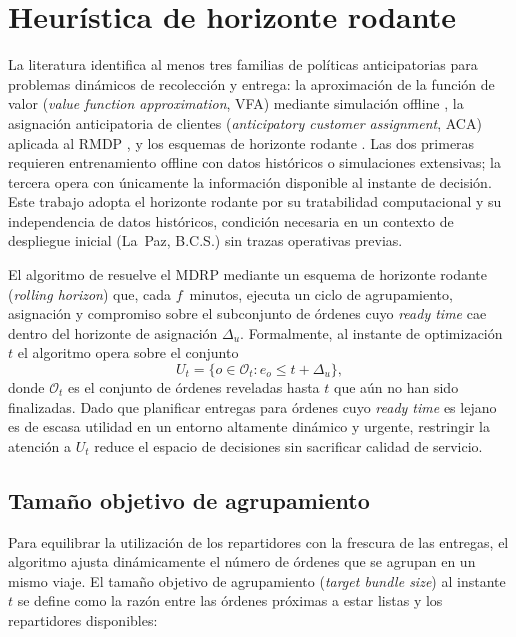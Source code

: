 \documentclass[12pt,letterpaper,oneside]{book}
\begin{document}
	\section{Heurística de horizonte rodante}

	La literatura identifica al menos tres familias de políticas
	anticipatorias para problemas dinámicos de recolección y entrega: la
	aproximación de la función de valor (\textit{value function
	approximation}, VFA) mediante simulación offline
	\citep{Ulmer2018VFA}, la asignación anticipatoria de clientes
	(\textit{anticipatory customer assignment}, ACA) aplicada al RMDP
	\citep{Ulmer2021RMDP}, y los esquemas de horizonte rodante
	\citep{Reyes2018}.  Las dos primeras requieren entrenamiento offline
	con datos históricos o simulaciones extensivas; la tercera opera con
	únicamente la información disponible al instante de decisión.  Este
	trabajo adopta el horizonte rodante por su tratabilidad computacional
	y su independencia de datos históricos, condición necesaria en un
	contexto de despliegue inicial (La~Paz, B.C.S.) sin trazas operativas
	previas.

	El algoritmo de \citet{Reyes2018} resuelve el MDRP mediante un esquema de
	horizonte rodante (\textit{rolling horizon}) que, cada $f$~minutos,
	ejecuta un ciclo de agrupamiento, asignación y compromiso sobre el
	subconjunto de órdenes cuyo \textit{ready time} cae dentro del horizonte de
	asignación $\Delta_u$.  Formalmente, al instante de optimización $t$ el
	algoritmo opera sobre el conjunto
	\[
		U_t = \{o \in \mathcal{O}_t : e_o \leq t + \Delta_u\},
	\]
	donde $\mathcal{O}_t$ es el conjunto de órdenes reveladas hasta $t$ que aún
	no han sido finalizadas.  Dado que planificar entregas para órdenes cuyo
	\textit{ready time} es lejano es de escasa utilidad en un entorno altamente
	dinámico y urgente, restringir la atención a $U_t$ reduce el espacio de
	decisiones sin sacrificar calidad de servicio.

	\subsection{Tamaño objetivo de agrupamiento}

	Para equilibrar la utilización de los repartidores con la frescura de las
	entregas, el algoritmo ajusta dinámicamente el número de órdenes que se
	agrupan en un mismo viaje.  El tamaño objetivo de agrupamiento
	(\textit{target bundle size}) al instante $t$ se define como la razón entre
	las órdenes próximas a estar listas y los repartidores disponibles:
\end{document}
